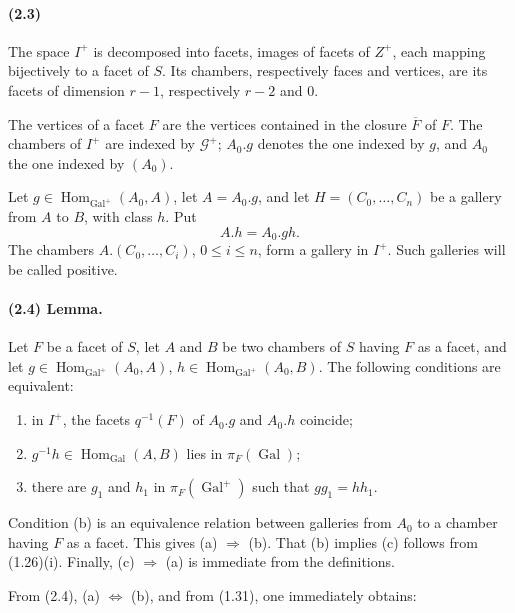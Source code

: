 \documentclass[10pt]{article}
\begin{document}
\paragraph{(2.3)} The space \(I^+\) is decomposed into facets, images of facets of \(Z^+\), each mapping bijectively to a facet of \(S\). Its chambers, respectively faces and vertices, are its facets of dimension \(r-1\), respectively \(r-2\) and \(0\).

The vertices of a facet \(F\) are the vertices contained in the closure \(\overline F\) of \(F\). The chambers of \(I^+\) are indexed by \(\mathcal G^+\); \(A_0.g\) denotes the one indexed by \(g\), and \(A_0\) the one indexed by \((A_0)\).

Let \(g\in\operatorname{Hom}_{\operatorname{Gal}^+}(A_0,A)\), let \(A=A_0.g\), and let \(H=(C_0,\ldots,C_n)\) be a gallery from \(A\) to \(B\), with class \(h\). Put
\[
A.h=A_0.gh.
\]
The chambers \(A.(C_0,\ldots,C_i)\), \(0\le i\le n\), form a gallery in \(I^+\). Such galleries will be called positive.

\paragraph{(2.4) Lemma.} Let \(F\) be a facet of \(S\), let \(A\) and \(B\) be two chambers of \(S\) having \(F\) as a facet, and let \(g\in\operatorname{Hom}_{\operatorname{Gal}^+}(A_0,A)\), \(h\in\operatorname{Hom}_{\operatorname{Gal}^+}(A_0,B)\). The following conditions are equivalent:
\begin{enumerate}[label=(\alph*)]
\item in \(I^+\), the facets \(q^{-1}(F)\) of \(A_0.g\) and \(A_0.h\) coincide;
\item \(g^{-1}h\in\operatorname{Hom}_{\operatorname{Gal}}(A,B)\) lies in \(\pi_F(\operatorname{Gal})\);
\item there are \(g_1\) and \(h_1\) in \(\pi_F(\operatorname{Gal}^+)\) such that \(gg_1=hh_1\).
\end{enumerate}
Condition (b) is an equivalence relation between galleries from \(A_0\) to a chamber having \(F\) as a facet. This gives (a) \(\Rightarrow\) (b). That (b) implies (c) follows from (1.26)(i). Finally, (c) \(\Rightarrow\) (a) is immediate from the definitions.

From (2.4), (a) \(\Leftrightarrow\) (b), and from (1.31), one immediately obtains:
\end{document}
